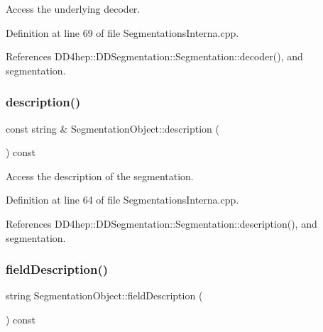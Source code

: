 Access the underlying decoder. 



Definition at line 69 of file Segmentations\+Interna.\+cpp.



References D\+D4hep\+::\+D\+D\+Segmentation\+::\+Segmentation\+::decoder(), and segmentation.

\hypertarget{class_d_d4hep_1_1_geometry_1_1_segmentation_object_a930896247114bce26d42b6966e2f8ac5}{}\label{class_d_d4hep_1_1_geometry_1_1_segmentation_object_a930896247114bce26d42b6966e2f8ac5} 
\subsubsection{\texorpdfstring{description()}{description()}}
{\footnotesize\ttfamily const string \& Segmentation\+Object\+::description (\begin{DoxyParamCaption}{ }\end{DoxyParamCaption}) const}



Access the description of the segmentation. 



Definition at line 64 of file Segmentations\+Interna.\+cpp.



References D\+D4hep\+::\+D\+D\+Segmentation\+::\+Segmentation\+::description(), and segmentation.

\hypertarget{class_d_d4hep_1_1_geometry_1_1_segmentation_object_a1f40d9e8f8024eee33a7b7a29509f9c7}{}\label{class_d_d4hep_1_1_geometry_1_1_segmentation_object_a1f40d9e8f8024eee33a7b7a29509f9c7} 
\subsubsection{\texorpdfstring{field\+Description()}{fieldDescription()}}
{\footnotesize\ttfamily string Segmentation\+Object\+::field\+Description (\begin{DoxyParamCaption}{ }\end{DoxyParamCaption}) const}



